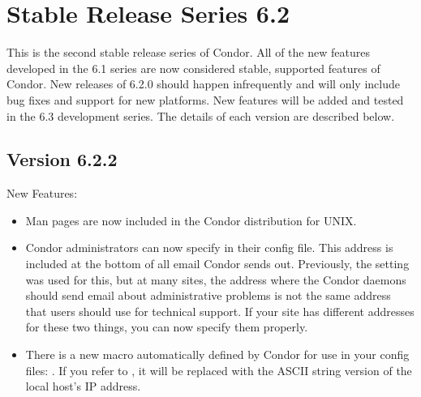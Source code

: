 \section{Stable Release Series 6.2}\label{sec:History-6-2}

This is the second stable release series of Condor.
All of the new features developed in the 6.1 series are now considered
stable, supported features of Condor.
New releases of 6.2.0 should happen infrequently and will only include
bug fixes and support for new platforms.
New features will be added and tested in the 6.3 development series. 
The details of each version are described below.


\subsection*{\label{sec:New-6-2-2}Version 6.2.2}
\noindent New Features:
\begin{itemize}

\item Man pages are now included in the Condor distribution for UNIX.

\item Condor administrators can now specify
 in their config file.
This address is included at the bottom of all email Condor sends out.
Previously, the  setting was used for this, but
at many sites, the address where the Condor daemons should send email
about administrative problems is not the same address that users
should use for technical support.
If your site has different addresses for these two things, you can now
specify them properly.

\item There is a new macro automatically defined by Condor for use in
your config files: .
If you refer to , it will be replaced with the
ASCII string version of the local host's IP address.

\end{itemize}

